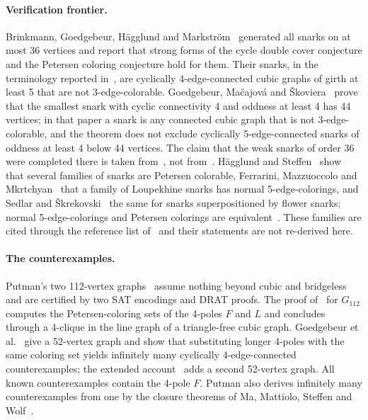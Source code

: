 \documentclass[11pt]{article}
\theoremstyle{definition}
\theoremstyle{remark}
\newcommand{\Gmain}{G_{112}}
\begin{document}
\paragraph{Verification frontier.} Brinkmann, Goedgebeur, H\"agglund and
Markstr\"om~\cite{BGHM2013} generated all snarks on at most 36 vertices and report that strong forms
of the cycle double cover conjecture and the Petersen coloring conjecture hold for them. Their
snarks, in the terminology reported in~\cite{GJMMM2026}, are cyclically 4-edge-connected cubic graphs of girth at least 5 that are not 3-edge-colorable.
Goedgebeur, Ma\v{c}ajov\'a and \v{S}koviera~\cite{GMS2019} prove that the smallest snark with cyclic
connectivity 4 and oddness at least 4 has 44 vertices; in that paper a snark is any connected cubic
graph that is not 3-edge-colorable, and the theorem does not exclude cyclically 5-edge-connected
snarks of oddness at least 4 below 44 vertices. The claim that the weak snarks of order 36 were
completed there is taken from~\cite{GJMMM2026}, not from~\cite{GMS2019}. H\"agglund and
Steffen~\cite{HS2014} show that several families of snarks are Petersen colorable, Ferrarini,
Mazzuoccolo and Mkrtchyan~\cite{FMM2019} that a family of Loupekhine snarks has normal
5-edge-colorings, and Sedlar and \v{S}krekovski~\cite{SS2024} the same for snarks superpositioned by
flower snarks; normal 5-edge-colorings and Petersen colorings are equivalent~\cite{Jaeger1985}. These
families are cited through the reference list of~\cite{Putman2026} and their statements are not
re-derived here.

\paragraph{The counterexamples.} Putman's two 112-vertex graphs~\cite{Putman2026} assume nothing
beyond cubic and bridgeless and are certified by two SAT encodings and DRAT proofs. The proof
of~\cite{GJMMMU2026} for $\Gmain$ computes the Petersen-coloring sets of the 4-poles $F$ and $L$
and concludes through a 4-clique in the line graph of a triangle-free cubic graph. Goedgebeur
et al.~\cite{GJMMM2026} give a 52-vertex graph and show that substituting longer 4-poles with the
same coloring set yields infinitely many cyclically 4-edge-connected counterexamples; the extended
account~\cite{GJMMMU2026} adds a second 52-vertex graph. All known counterexamples contain the
4-pole $F$. Putman also derives infinitely many counterexamples from one by the closure
theorems of Ma, Mattiolo, Steffen and Wolf~\cite{MMSW2025}.
\end{document}
